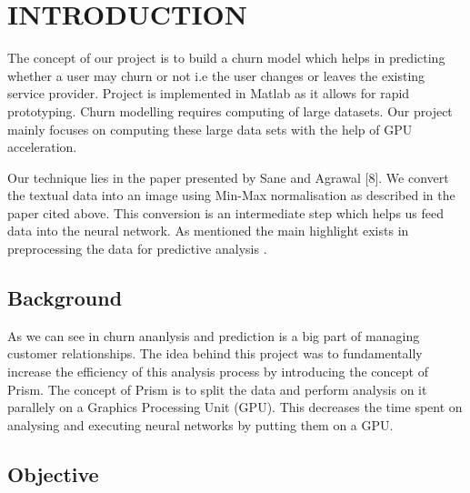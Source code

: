 

\chapter{INTRODUCTION}

\hspace{0.9cm} The concept of our project is to build a churn model which helps in predicting whether a user may churn or not i.e the user changes or leaves the existing service provider. Project is implemented in Matlab as it allows for rapid prototyping. Churn modelling requires computing of large datasets. Our project mainly focuses on computing these large data sets with the help of GPU acceleration.

Our technique lies in the paper presented by Sane and Agrawal \cite{citation-8}[8]. We convert the textual data into an image using Min-Max normalisation as described in the paper cited above. This conversion is an intermediate step which helps us feed data into the neural network. As mentioned the main highlight exists in preprocessing the data for predictive analysis \cite{citation-1}.




\section{Background}

\hspace{0.9cm} As we can see in \cite{citation-1} churn ananlysis and prediction is a big part of managing customer relationships. The idea behind this project was to fundamentally increase the efficiency of this analysis process by introducing the concept of Prism. The concept of Prism is to split the data and perform analysis on it parallely on a Graphics Processing Unit (GPU). This decreases the time spent on analysing and executing neural networks by putting them on a GPU.

\section{Objective}


